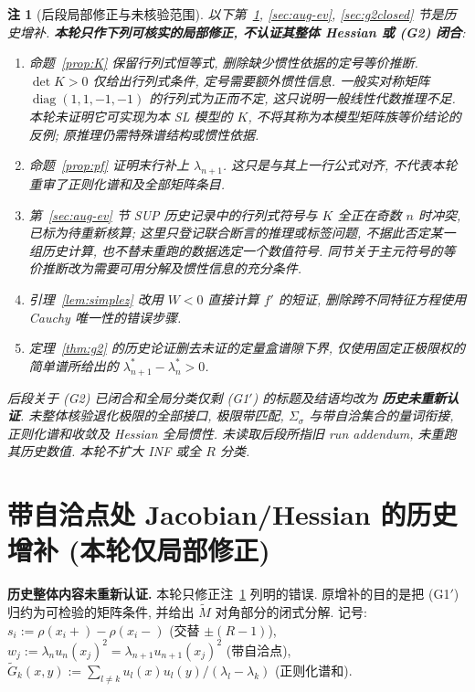 \documentclass[UTF8]{ctexart}
\newtheorem{remark}[theorem]{注}
\begin{document}
\begin{remark}[后段局部修正与未核验范围]\label{rem:retained-scope}
以下第~\ref{sec:aug}, \ref{sec:aug-ev}, \ref{sec:g2closed} 节是历史增补.
\textbf{本轮只作下列可核实的局部修正, 不认证其整体 Hessian 或 (G2) 闭合}:
\begin{enumerate}
\item 命题~\ref{prop:K} 保留行列式恒等式, 删除缺少惯性依据的定号等价推断.
$\det K>0$ 仅给出行列式条件, 定号需要额外惯性信息.
一般实对称矩阵 $\operatorname{diag}(1,1,-1,-1)$ 的行列式为正而不定,
这只说明一般线性代数推理不足. 本轮未证明它可实现为本 SL 模型的 $K$,
不将其称为本模型矩阵族等价结论的反例; 原推理仍需特殊谱结构或惯性依据.
\item 命题~\ref{prop:pf} 证明末行补上 $\lambda_{n+1}$.
这只是与其上一行公式对齐, 不代表本轮重审了正则化谱和及全部矩阵条目.
\item 第~\ref{sec:aug-ev} 节 SUP 历史记录中的行列式符号与 $K$ 全正在奇数 $n$
时冲突, 已标为待重新核算; 这里只登记联合断言的推理或标签问题,
不据此否定某一组历史计算, 也不替未重跑的数据选定一个数值符号.
同节关于主元符号的等价推断改为需要可用分解及惯性信息的充分条件.
\item 引理~\ref{lem:simplez} 改用 $W<0$ 直接计算 $f'$ 的短证,
删除跨不同特征方程使用 Cauchy 唯一性的错误步骤.
\item 定理~\ref{thm:g2} 的历史论证删去未证的定量盒谱隙下界,
仅使用固定正极限权的简单谱所给出的 $\lambda_{n+1}^*-\lambda_n^*>0$.
\end{enumerate}
后段关于 (G2) 已闭合和全局分类仅剩 (G1$'$) 的标题及结语均改为
\textbf{历史未重新认证}. 未整体核验退化极限的全部接口, 极限带匹配,
$\Sigma_\sigma$ 与带自洽集合的量词衔接, 正则化谱和收敛及 Hessian 全局惯性.
未读取后段所指旧 run addendum, 未重跑其历史数值. 本轮不扩大 INF 或全 $R$ 分类.
\end{remark}

\section{带自洽点处 Jacobian/Hessian 的历史增补 (本轮仅局部修正)}\label{sec:aug}

\textbf{历史整体内容未重新认证.} 本轮只修正注~\ref{rem:retained-scope} 列明的错误.
原增补的目的是把 (G1$'$) 归约为可检验的矩阵条件, 并给出
$\tilde M$ 对角部分的闭式分解. 记号: $s_i:=\rho(x_i+)-\rho(x_i-)$
(交替 $\pm(R-1)$), $w_j:=\lambda_nu_n(x_j)^2=\lambda_{n+1}u_{n+1}(x_j)^2$
(带自洽点), $\tilde G_k(x,y):=\sum_{l\ne k}u_l(x)u_l(y)/(\lambda_l-\lambda_k)$
(正则化谱和).
\end{document}
